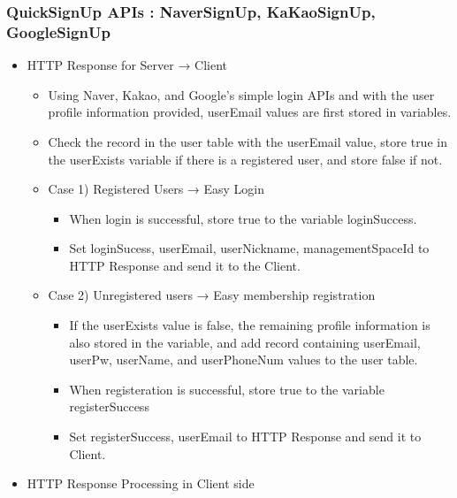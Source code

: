 \documentclass[conference]{IEEEtran}
\begin{document}
\subsubsection{QuickSignUp APIs : NaverSignUp, KaKaoSignUp, GoogleSignUp}
\begin{itemize}
    \item HTTP Response for Server → Client
    \begin{itemize}
        \item Using Naver, Kakao, and Google's simple login APIs and with the user profile information provided, userEmail values are first stored in variables.
        \item Check the record in the user table with the userEmail value, store true in the userExists variable if there is a registered user, and store false if not.
        \item Case 1) Registered Users → Easy Login
        \begin{itemize}
            \itemIf the userExists value is true, check the record in the user table with the userEmail value, and if there are user\_nickname and management\_space\_id values, store them in the userNickname and managementSpaceId variables, and if not, store null.
            \item When login is successful, store true to the variable loginSuccess.
            \item Set loginSucess, userEmail, userNickname, managementSpaceId to HTTP Response and send it to the Client.
        \end{itemize}
        \item Case 2) Unregistered users → Easy membership registration
        \begin{itemize}
            \item If the userExists value is false, the remaining profile information is also stored in the variable, and add record containing userEmail, userPw, userName, and userPhoneNum values to the user table.
            \item When registeration is successful, store true to the variable registerSuccess
            \item Set registerSuccess, userEmail to HTTP Response and send it to Client.
            \\
        \end{itemize}
    \end{itemize}
    \item HTTP Response Processing in Client side
    \begin{itemize}

\end{itemize}
\end{itemize}
\end{document}
